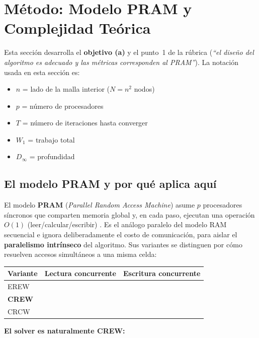 \documentclass[11pt,a4paper]{article}
\newcommand{\cmark}{\ding{51}}
\newcommand{\xmark}{\ding{55}}
\begin{document}
	\section{Método: Modelo PRAM y Complejidad Teórica}
	\label{sec:metodo}
	\enlargethispage{3 \baselineskip}
	Esta sección desarrolla el \textbf{objetivo (a)} y el punto~1 de la rúbrica
	(\textit{``el diseño del algoritmo es adecuado y las métricas corresponden al
	PRAM''}). La notación usada en esta sección es:
	\begin{itemize}[itemsep=0pt, topsep=2pt, parsep=0pt, leftmargin=1.4em]
		\item $n$ = lado de la malla interior ($N=n^2$ nodos)
		\item $p$ = número de procesadores
		\item $T$ = número de iteraciones hasta converger
		\item $W_1$ = trabajo total
		\item $D_\infty$ = profundidad
	\end{itemize}

	\subsection{El modelo PRAM y por qué aplica aquí}

	El modelo \textbf{PRAM} (\textit{Parallel Random Access Machine}) asume $p$
	procesadores síncronos que comparten memoria global y, en cada paso, ejecutan una
	operación $O(1)$ (leer/calcular/escribir) \cite{jaja1992}. Es el análogo paralelo
	del modelo RAM secuencial e ignora deliberadamente el costo de comunicación, para
	aislar el \textbf{paralelismo intrínseco} del algoritmo. Sus variantes se
	distinguen por cómo resuelven accesos simultáneos a una misma celda:

	\begin{center}
	\begin{tabular}{lcc}
		\toprule
		\textbf{Variante} & \textbf{Lectura concurrente} & \textbf{Escritura concurrente} \\
		\midrule
		EREW & \xmark & \xmark \\
		\textbf{CREW} & \cmark & \xmark \\
		CRCW & \cmark & \cmark \\
		\bottomrule
	\end{tabular}
	\end{center}

	\textbf{El solver es naturalmente CREW:}
\end{document}

